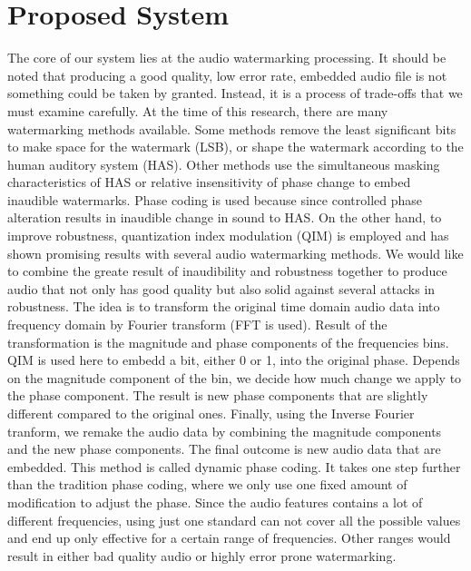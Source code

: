 \documentclass[conference]{IEEEtran}
\begin{document}
\section{Proposed System}

The core of our system lies at the audio watermarking processing. It should be noted that producing a good quality, low error rate, embedded audio file is not something could be taken by granted. Instead, it is a process of trade-offs that we must examine carefully. At the time of this research, there are many watermarking methods available. Some methods remove the least significant bits to make space for the watermark (LSB), or shape the watermark according to the human auditory system (HAS). Other methods use the simultaneous masking characteristics of HAS or relative insensitivity of phase change to embed inaudible watermarks. Phase coding is used because since controlled phase alteration results in inaudible change in sound to HAS. On the other hand, to improve robustness, quantization index modulation (QIM) is employed and has shown promising results with several audio watermarking methods. We would like to combine the greate result of inaudibility and robustness together to produce audio that not only has good quality but also solid against several attacks in robustness. The idea is to transform the original time domain audio data into frequency domain by Fourier transform (FFT is used). Result of the transformation is the magnitude and phase components of the frequencies bins. QIM is used here to embedd a bit, either 0 or 1, into the original phase. Depends on the magnitude component of the bin, we decide how much change we apply to the phase component. The result is new phase components that are slightly different compared to the original ones. Finally, using the Inverse Fourier tranform, we remake the audio data by combining the magnitude components and the new phase components. The final outcome is new audio data that are embedded. This method is called dynamic phase coding. It takes one step further than the tradition phase coding, where we only use one fixed amount of modification to adjust the phase. Since the audio features contains a lot of different frequencies, using just one standard can not cover all the possible values and end up only effective for a certain range of frequencies. Other ranges would result in either bad quality audio or highly error prone watermarking. 
\end{document}
